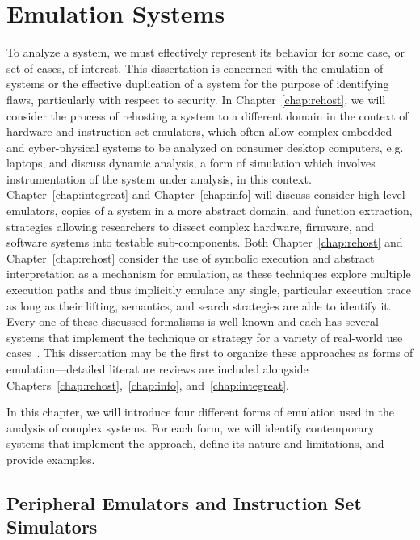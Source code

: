 \chapter{Emulation Systems}
\label{chap:emulation}

To analyze a system, we must effectively represent its behavior for some case, or set of cases, of interest.
This dissertation is concerned with the emulation of systems or the effective duplication of a system for the purpose of identifying flaws, particularly with respect to security.
In Chapter~\ref{chap:rehost}, we will consider the process of rehosting a system to a different domain in the context of hardware and instruction set emulators, which often allow complex embedded and cyber-physical systems to be analyzed on consumer desktop computers, e.g. laptops, and discuss dynamic analysis, a form of simulation which involves instrumentation of the system under analysis, in this context.
Chapter~\ref{chap:integreat} and Chapter~\ref{chap:info} will discuss consider high-level emulators, copies of a system in a more abstract domain, and function extraction, strategies allowing researchers to dissect complex hardware, firmware, and software systems into testable sub-components.
Both Chapter~\ref{chap:rehost} and Chapter~\ref{chap:rehost} consider the use of symbolic execution and abstract interpretation as a mechanism for emulation, as these techniques explore multiple execution paths and thus implicitly emulate any single, particular execution trace as long as their lifting, semantics, and search strategies are able to identify it.
Every one of these discussed formalisms is well-known and each has several systems that implement the technique or strategy for a variety of real-world use cases~\cite{bellard2005qemu, quynh2015unicorn, deng2013bistro, caballero2009binary, sen2013jalangi, zaddach2014avatar, wang2017angr, cadar2008klee}.
This dissertation may be the first to organize these approaches as forms of emulation---detailed literature reviews are included alongside Chapters~\ref{chap:rehost},\ \ref{chap:info}, and~\ref{chap:integreat}.

In this chapter, we will introduce four different forms of emulation used in the analysis of complex systems.
For each form, we will identify contemporary systems that implement the approach, define its nature and limitations, and provide examples.

\section{Peripheral Emulators and Instruction Set Simulators}
\label{sec:hardemu}

